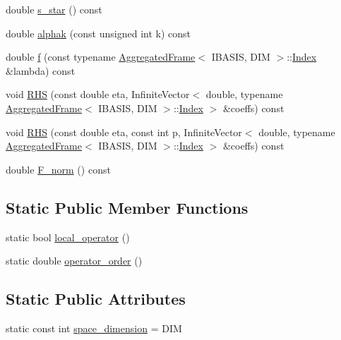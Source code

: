 \begin{CompactItemize}
\item 
double \hyperlink{classFrameTL_1_1SimpleBiharmonicEquation_1948f60a5da7ba5f9d1737817741ca6a}{s\_\-star} () const 
\item 
double \hyperlink{classFrameTL_1_1SimpleBiharmonicEquation_d7aedcf83a6ee9d35ec8086eb9d7a528}{alphak} (const unsigned int k) const 
\item 
double \hyperlink{classFrameTL_1_1SimpleBiharmonicEquation_cea8f8210b9b4717080f54b9aafa7e28}{f} (const typename \hyperlink{classFrameTL_1_1AggregatedFrame}{AggregatedFrame}$<$ IBASIS, DIM $>$::\hyperlink{classFrameTL_1_1FrameIndex}{Index} \&lambda) const 
\item 
void \hyperlink{classFrameTL_1_1SimpleBiharmonicEquation_1933d37148f59cd1eb3c4b2dcbee396f}{RHS} (const double eta, InfiniteVector$<$ double, typename \hyperlink{classFrameTL_1_1AggregatedFrame}{AggregatedFrame}$<$ IBASIS, DIM $>$::\hyperlink{classFrameTL_1_1FrameIndex}{Index} $>$ \&coeffs) const 
\item 
void \hyperlink{classFrameTL_1_1SimpleBiharmonicEquation_c3e82086527e9d3306dcabb21ccdda3a}{RHS} (const double eta, const int p, InfiniteVector$<$ double, typename \hyperlink{classFrameTL_1_1AggregatedFrame}{AggregatedFrame}$<$ IBASIS, DIM $>$::\hyperlink{classFrameTL_1_1FrameIndex}{Index} $>$ \&coeffs) const 
\item 
double \hyperlink{classFrameTL_1_1SimpleBiharmonicEquation_45b992d91338680827a645647e11c95d}{F\_\-norm} () const 
\end{CompactItemize}
\subsection*{Static Public Member Functions}
\begin{CompactItemize}
\item 
static bool \hyperlink{classFrameTL_1_1SimpleBiharmonicEquation_24c6d03c5657afb6a6758c55278a33d3}{local\_\-operator} ()
\item 
static double \hyperlink{classFrameTL_1_1SimpleBiharmonicEquation_f0bb15f82dc56ef8739a37af36d52cb0}{operator\_\-order} ()
\end{CompactItemize}
\subsection*{Static Public Attributes}
\begin{CompactItemize}
\item 
static const int \hyperlink{classFrameTL_1_1SimpleBiharmonicEquation_286b0e4560f9b71e48db27f7a1f80a37}{space\_\-dimension} = DIM
\end{CompactItemize}
